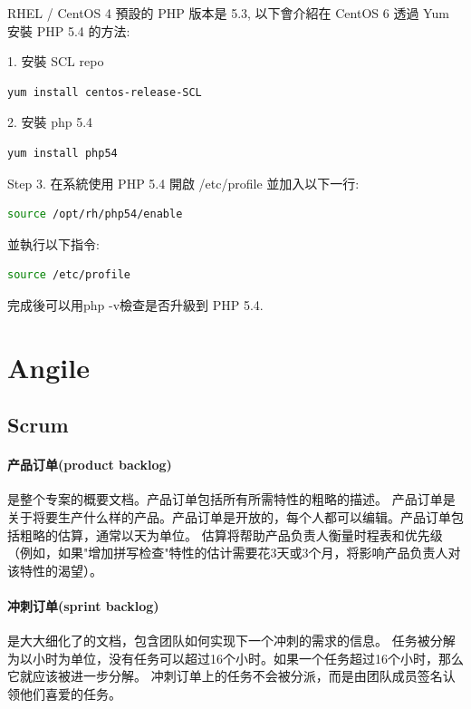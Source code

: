 \documentclass{book}
\begin{document}
RHEL / CentOS 4 預設的 PHP 版本是 5.3, 以下會介紹在 CentOS 6 透過 Yum 安裝 PHP 5.4 的方法:

1. 安裝 SCL repo

\begin{lstlisting}[language=Bash]
yum install centos-release-SCL
\end{lstlisting}


2. 安裝 php 5.4

\begin{lstlisting}[language=Bash]
yum install php54
\end{lstlisting}

Step 3. 在系統使用 PHP 5.4
開啟 /etc/profile 並加入以下一行:

\begin{lstlisting}[language=Bash]
source /opt/rh/php54/enable
\end{lstlisting}

並執行以下指令:

\begin{lstlisting}[language=Bash]
source /etc/profile
\end{lstlisting}

完成後可以用php -v檢查是否升級到 PHP 5.4.

\section{Angile}

\subsection{Scrum}

\paragraph{产品订单(product backlog)}是整个专案的概要文档。产品订单包括所有所需特性的粗略的描述。
产品订单是关于将要生产什么样的产品。产品订单是开放的，每个人都可以编辑。产品订单包括粗略的估算，通常以天为单位。
估算将帮助产品负责人衡量时程表和优先级（例如，如果"增加拼写检查"特性的估计需要花3天或3个月，将影响产品负责人对该特性的渴望）。

\paragraph{冲刺订单(sprint backlog)}是大大细化了的文档，包含团队如何实现下一个冲刺的需求的信息。
任务被分解为以小时为单位，没有任务可以超过16个小时。如果一个任务超过16个小时，那么它就应该被进一步分解。
冲刺订单上的任务不会被分派，而是由团队成员签名认领他们喜爱的任务。
\end{document}
